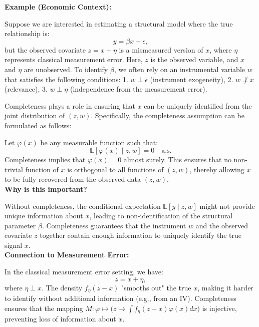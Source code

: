 \documentclass{article}
\begin{document}
\begin{example}
    \textbf{Example (Economic Context):} 

Suppose we are interested in estimating a structural model where the true relationship is:
\[
y = \beta x + \epsilon,
\]
but the observed covariate \(z = x + \eta\) is a mismeasured version of \(x\), where \(\eta\) represents classical measurement error. Here, \(z\) is the observed variable, and \(x\) and \(\eta\) are unobserved. To identify \(\beta\), we often rely on an instrumental variable \(w\) that satisfies the following conditions:
1. \(w \perp \epsilon\) (instrument exogeneity),
2. \(w \not\perp x\) (relevance),
3. \(w \perp \eta\) (independence from the measurement error).

Completeness plays a role in ensuring that \(x\) can be uniquely identified from the joint distribution of \((z, w)\). Specifically, the completeness assumption can be formulated as follows:

Let \(\varphi(x)\) be any measurable function such that:
\[
\mathbb{E}[\varphi(x) \mid z, w] = 0 \quad \text{a.s.}
\]
Completeness implies that \(\varphi(x) = 0\) almost surely. This ensures that no non-trivial function of \(x\) is orthogonal to all functions of \((z, w)\), thereby allowing \(x\) to be fully recovered from the observed data \((z, w)\). \\

\textbf{Why is this important?} 

Without completeness, the conditional expectation \(\mathbb{E}[y \mid z, w]\) might not provide unique information about \(x\), leading to non-identification of the structural parameter \(\beta\). Completeness guarantees that the instrument \(w\) and the observed covariate \(z\) together contain enough information to uniquely identify the true signal \(x\).\\

\textbf{Connection to Measurement Error:} 

In the classical measurement error setting, we have:
\[
z = x + \eta,
\]
where \(\eta \perp x\). The density \(f_\eta(z - x)\) "smooths out" the true \(x\), making it harder to identify without additional information (e.g., from an IV). Completeness ensures that the mapping \(M: \varphi \mapsto \big( z \mapsto \int f_\eta(z - x) \varphi(x) dx \big)\) is injective, preventing loss of information about \(x\). \\




\end{example}
\end{document}
